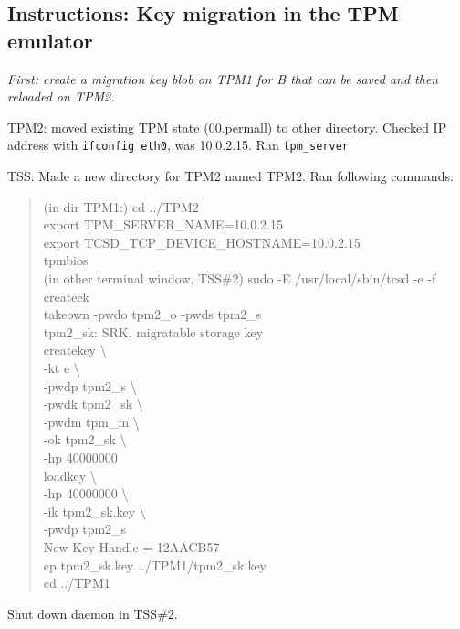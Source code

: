\documentclass[10pt]{article}
\newcommand{\command}[1]{\texttt{#1}}
\begin{document}
\subsection{Instructions: Key migration in the TPM emulator}
\textit{First: create a migration key blob on TPM1 for B that can be saved and then reloaded on TPM2.}

TPM2: moved existing TPM state (00.permall) to other directory. Checked IP address with \command{ifconfig eth0}, was 10.0.2.15. Ran \command{tpm\_server}

TSS: Made a new directory for TPM2 named TPM2. Ran following commands: \\
\begin{quote}
(in dir TPM1:) cd ../TPM2 \\
export TPM\_SERVER\_NAME=10.0.2.15 \\
export TCSD\_TCP\_DEVICE\_HOSTNAME=10.0.2.15 \\
tpmbios \\
(in other terminal window, TSS\#2) sudo -E /usr/local/sbin/tcsd -e -f \\

createek \\
takeown -pwdo tpm2\_o -pwds tpm2\_s \\

tpm2\_sk: SRK, migratable storage key \\
createkey \textbackslash \\
    -kt e \textbackslash \\
    -pwdp tpm2\_s \textbackslash \\
    -pwdk tpm2\_sk \textbackslash \\
    -pwdm tpm\_m \textbackslash \\
    -ok tpm2\_sk \textbackslash \\
    -hp 40000000 \\

loadkey \textbackslash \\
    -hp 40000000 \textbackslash \\
    -ik tpm2\_sk.key \textbackslash \\
    -pwdp tpm2\_s \\
New Key Handle = 12AACB57 \\

cp tpm2\_sk.key ../TPM1/tpm2\_sk.key \\
cd ../TPM1
\end{quote}

Shut down daemon in TSS\#2.
\end{document}
